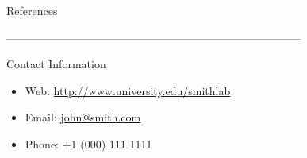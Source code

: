 \documentclass[final,hyperref={pdfpagelabels=false}]{beamer}
\begin{document}
\begin{frame}[t]
\begin{columns}[t]
\begin{column}{.465\textwidth}

\begin{block}{References}
        
\nocite{*} %
\small{
}

\end{block}


--------------------------------------------------------------------------------

\begin{block}{Contact Information}
	
	\begin{itemize}
		\item Web: \href{http://www.university.edu/smithlab}{http://www.university.edu/smithlab}
		\item Email: \href{mailto:john@smith.com}{john@smith.com}
		\item Phone: +1 (000) 111 1111
	\end{itemize}
	
\end{block}


\end{column} %

\begin{column}{.015\textwidth}\end{column} %

\end{columns} %

\end{frame} %
\end{document}
